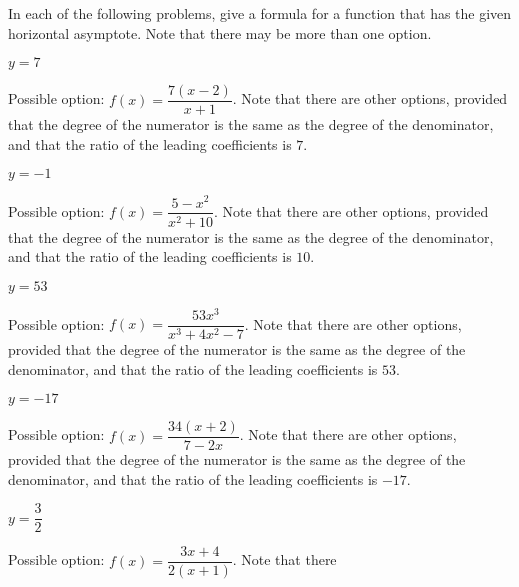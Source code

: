 \begin{exercises}
\begin{problem}
In each of the following problems, give a formula for a function that 
has the given horizontal asymptote. Note that there may be more than one option.
\begin{multicols}{4}
	\begin{subproblem}
		$y=7$ 
		\begin{shortsolution}
			Possible option: $f(x)=\dfrac{7(x-2)}{x+1}$. Note that there
			are other options, provided that the degree of the numerator is the same as the degree
			of the denominator, and that the ratio of the leading 
			coefficients is $7$.
		\end{shortsolution}
	\end{subproblem}
	\begin{subproblem}
		$y=-1$ 
		\begin{shortsolution}
			Possible option: $f(x)=\dfrac{5-x^2}{x^2+10}$. Note that there
			are other options, provided that the degree of the numerator is the same as the degree
			of the denominator, and that the ratio of the leading 
			coefficients is $10$.
		\end{shortsolution}
	\end{subproblem}
	\begin{subproblem}
		$y=53$ 
		\begin{shortsolution}
			Possible option: $f(x)=\dfrac{53x^3}{x^3+4x^2-7}$. Note that there
			are other options, provided that the degree of the numerator is the same as the degree
			of the denominator, and that the ratio of the leading 
			coefficients is $53$.
		\end{shortsolution}
	\end{subproblem}
	\begin{subproblem}
		$y=-17$ 
		\begin{shortsolution}
			Possible option: $f(x)=\dfrac{34(x+2)}{7-2x}$. Note that there
			are other options, provided that the degree of the numerator is the same as the degree
			of the denominator, and that the ratio of the leading 
			coefficients is $-17$.
		\end{shortsolution}
	\end{subproblem}
	\begin{subproblem}
		$y=\dfrac{3}{2}$ 
		\begin{shortsolution}
			Possible option: $f(x)=\dfrac{3x+4}{2(x+1)}$. Note that there

\end{shortsolution}
\end{subproblem}
\end{multicols}
\end{problem}
\end{exercises}
